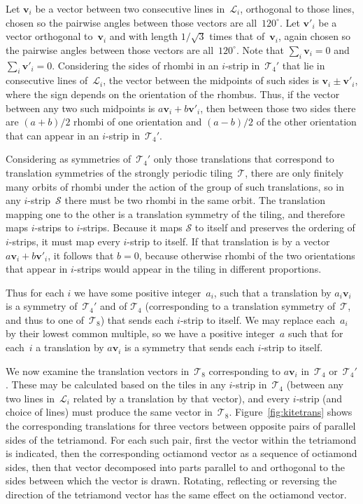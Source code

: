 Let $\mathbf{v}_i$ be a vector between two consecutive lines
in~$\mathcal{L}_i$, orthogonal to those lines, chosen so the pairwise
angles between those vectors are all~$120^\circ$.  Let $\mathbf{v}'_i$
be a vector orthogonal to~$\mathbf{v}_i$ and with length $1/\sqrt{3}$
times that of~$\mathbf{v}_i$, again chosen so the pairwise angles
between those vectors are all~$120^\circ$.  Note that $\sum_i
\mathbf{v}_i = 0$ and $\sum_i \mathbf{v}'_i = 0$.  Considering the
sides of rhombi in an $i$-strip in~$\mathcal{T}_4'$ that lie in
consecutive lines of~$\mathcal{L}_i$, the vector between the midpoints
of such sides is $\mathbf{v}_i \pm \mathbf{v}'_i$, where the sign
depends on the orientation of the rhombus.  Thus, if the vector
between any two such midpoints is $a \mathbf{v}_i + b \mathbf{v}'_i$,
then between those two sides there are $(a+b)/2$ rhombi of one
orientation and $(a-b)/2$ of the other orientation that can appear in
an $i$-strip in~$\mathcal{T}_4'$.

Considering as symmetries of~$\mathcal{T}_4'$ only those translations
that correspond to translation symmetries of the strongly periodic
tiling~$\mathcal{T}$, there are only finitely many orbits of rhombi
under the action of the group of such translations, so in any
$i$-strip~$\mathcal{S}$ there must be two rhombi in the same orbit.
The translation mapping one to the other is a translation symmetry of
the tiling, and therefore maps $i$-strips to $i$-strips. Because it maps
$\mathcal{S}$ to itself and preserves the ordering of $i$-strips, it
must map every $i$-strip to itself.  If that translation is by a
vector $a \mathbf{v}_i + b \mathbf{v}'_i$, it follows that $b=0$,
because otherwise rhombi of the two orientations that appear in
$i$-strips would appear in the tiling in different proportions.

Thus for each $i$ we have some positive integer~$a_i$, such that a
translation by $a_i \mathbf{v}_i$ is a symmetry of~$\mathcal{T}_4'$
and of $\mathcal{T}_4$ (corresponding to a translation symmetry
of~$\mathcal{T}$, and thus to one of~$\mathcal{T}_8$) that sends each
$i$-strip to itself.  We may replace each~$a_i$ by their lowest common
multiple, so we have a positive integer~$a$ such that for each~$i$ a
translation by $a \mathbf{v}_i$ is a symmetry that sends each
$i$-strip to itself.

We now examine the translation vectors in~$\mathcal{T}_8$
corresponding to $a \mathbf{v}_i$ in~$\mathcal{T}_4$
or~$\mathcal{T}_4'$.  These may be calculated based on the tiles in
any $i$-strip in~$\mathcal{T}_4$ (between any two lines
in~$\mathcal{L}_i$ related by a translation by that vector), and every
$i$-strip (and choice of lines) must produce the same vector
in~$\mathcal{T}_8$.  Figure~\ref{fig:kitetrans} shows the
corresponding translations for three vectors between opposite pairs of
parallel sides of the tetriamond.  For each such pair, first the
vector within the tetriamond is indicated, then the corresponding
octiamond vector as a sequence of octiamond sides, then that vector
decomposed into parts parallel to and orthogonal to the sides between
which the vector is drawn.  Rotating, reflecting or reversing the
direction of the tetriamond vector has the same effect on the
octiamond vector.

